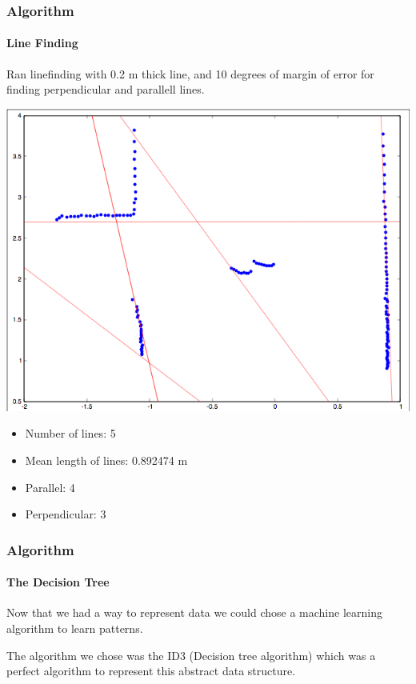 \documentclass{beamer}
\begin{document}
\begin{frame}
\frametitle{Algorithm}
\framesubtitle{Line Finding}
Ran linefinding with 0.2 m thick line, and 10 degrees of margin of error for finding perpendicular and parallell lines.

\vspace{10pt}

\includegraphics[scale=0.2]{presimg/humanlines.png}

\begin{itemize}
\item{Number of lines: 5}
\item{Mean length of lines: 0.892474 m}
\item{Parallel: 4}
\item{Perpendicular: 3}
\end{itemize}


\end{frame}

\begin{frame}
\frametitle{Algorithm}
\framesubtitle{The Decision Tree}

Now that we had a way to represent data we could chose a machine learning algorithm to learn patterns.

\pause
\vspace{10pt}

The algorithm we chose was the ID3 (Decision tree algorithm) which was a perfect algorithm to represent this abstract data structure.


\end{frame}
\end{document}
